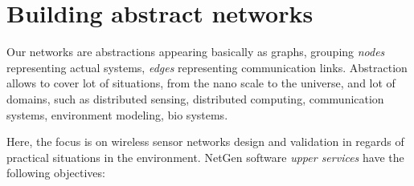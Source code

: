 \documentclass[times,a4paper]{book}
\begin{document}
\chapter{Building abstract networks}
\label{sec:chapter2}

Our networks are abstractions appearing basically as graphs, grouping {\sl nodes} representing  actual systems, {\sl edges} representing communication links.
Abstraction allows to cover lot of situations, from the nano scale to the universe, and lot of domains, such as distributed sensing, 
distributed computing, communication systems, environment modeling, bio systems.

Here, the focus is on wireless sensor networks design and validation in regards of practical situations in the environment.
NetGen software {\sl upper services} have the following objectives:
\end{document}
